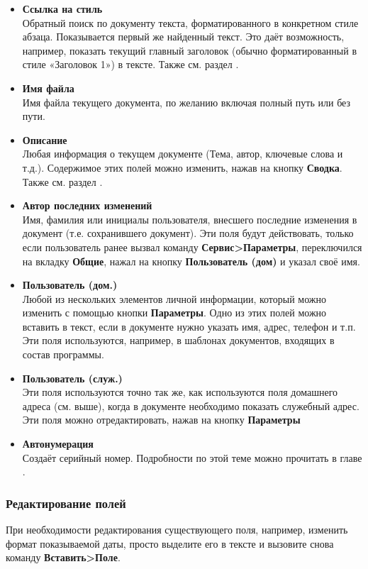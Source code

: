﻿\documentclass[a4paper,10pt]{article}
\begin{document}
\begin{itemize}
 \item \textbf{Ссылка на стиль}\\
 Обратный поиск по документу текста, форматированного в конкретном стиле абзаца. Показывается первый же найденный текст. Это даёт возможность, например, показать текущий главный заголовок (обычно форматированный в стиле «Заголовок 1») в тексте. Также см. раздел .
 \item \textbf{Имя файла}\\
 Имя файла текущего документа, по желанию включая полный путь или без пути.
 \item \textbf{Описание}\\
 Любая информация о текущем документе (Тема, автор, ключевые слова и т.д.). Содержимое этих полей можно изменить, нажав на кнопку \textbf{Сводка}. Также см. раздел .
 \item \textbf{Автор последних изменений}\\
 Имя, фамилия или инициалы пользователя, внесшего последние изменения в документ (т.е. сохранившего документ). Эти поля будут действовать, только если пользователь ранее вызвал команду \textbf{Сервис>Параметры}, переключился на вкладку \textbf{Общие}, нажал на кнопку \textbf{Пользователь (дом)} и указал своё имя.
 \item \textbf{Пользователь (дом.)}\\
 Любой из нескольких элементов личной информации, который можно изменить с помощью кнопки \textbf{Параметры}. Одно из этих полей можно вставить в текст, если в документе нужно указать имя, адрес, телефон и т.п. Эти поля используются, например, в шаблонах документов, входящих в состав программы.
 \item \textbf{Пользователь (служ.)}\\
 Эти поля используются точно так же, как используются поля домашнего адреса (см. выше), когда в документе необходимо показать служебный адрес. Эти поля можно отредактировать, нажав на кнопку \textbf{Параметры}
 \item \textbf{Автонумерация}\\
 Создаёт серийный номер. Подробности по этой теме можно прочитать в главе .
\end{itemize}

\subsubsection{Редактирование полей}
При необходимости редактирования существующего поля, например, изменить формат показываемой даты, просто выделите его в тексте и вызовите снова команду \textbf{Вставить>Поле}.
\end{document}
